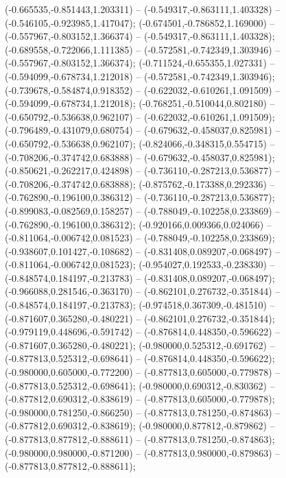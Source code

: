 (-0.665535,-0.851443,1.203311) -- (-0.549317,-0.863111,1.403328) -- (-0.546105,-0.923985,1.417047);
 (-0.674501,-0.786852,1.169000) -- (-0.557967,-0.803152,1.366374) -- (-0.549317,-0.863111,1.403328);
 (-0.689558,-0.722066,1.111385) -- (-0.572581,-0.742349,1.303946) -- (-0.557967,-0.803152,1.366374);
 (-0.711524,-0.655355,1.027331) -- (-0.594099,-0.678734,1.212018) -- (-0.572581,-0.742349,1.303946);
 (-0.739678,-0.584874,0.918352) -- (-0.622032,-0.610261,1.091509) -- (-0.594099,-0.678734,1.212018);
 (-0.768251,-0.510044,0.802180) -- (-0.650792,-0.536638,0.962107) -- (-0.622032,-0.610261,1.091509);
 (-0.796489,-0.431079,0.680754) -- (-0.679632,-0.458037,0.825981) -- (-0.650792,-0.536638,0.962107);
 (-0.824066,-0.348315,0.554715) -- (-0.708206,-0.374742,0.683888) -- (-0.679632,-0.458037,0.825981);
 (-0.850621,-0.262217,0.424898) -- (-0.736110,-0.287213,0.536877) -- (-0.708206,-0.374742,0.683888);
 (-0.875762,-0.173388,0.292336) -- (-0.762890,-0.196100,0.386312) -- (-0.736110,-0.287213,0.536877);
 (-0.899083,-0.082569,0.158257) -- (-0.788049,-0.102258,0.233869) -- (-0.762890,-0.196100,0.386312);
 (-0.920166,0.009366,0.024066) -- (-0.811064,-0.006742,0.081523) -- (-0.788049,-0.102258,0.233869);
 (-0.938607,0.101427,-0.108682) -- (-0.831408,0.089207,-0.068497) -- (-0.811064,-0.006742,0.081523);
 (-0.954027,0.192533,-0.238330) -- (-0.848574,0.184197,-0.213783) -- (-0.831408,0.089207,-0.068497);
 (-0.966088,0.281546,-0.363170) -- (-0.862101,0.276732,-0.351844) -- (-0.848574,0.184197,-0.213783);
 (-0.974518,0.367309,-0.481510) -- (-0.871607,0.365280,-0.480221) -- (-0.862101,0.276732,-0.351844);
 (-0.979119,0.448696,-0.591742) -- (-0.876814,0.448350,-0.596622) -- (-0.871607,0.365280,-0.480221);
 (-0.980000,0.525312,-0.691762) -- (-0.877813,0.525312,-0.698641) -- (-0.876814,0.448350,-0.596622);
 (-0.980000,0.605000,-0.772200) -- (-0.877813,0.605000,-0.779878) -- (-0.877813,0.525312,-0.698641);
 (-0.980000,0.690312,-0.830362) -- (-0.877812,0.690312,-0.838619) -- (-0.877813,0.605000,-0.779878);
 (-0.980000,0.781250,-0.866250) -- (-0.877813,0.781250,-0.874863) -- (-0.877812,0.690312,-0.838619);
 (-0.980000,0.877812,-0.879862) -- (-0.877813,0.877812,-0.888611) -- (-0.877813,0.781250,-0.874863);
 (-0.980000,0.980000,-0.871200) -- (-0.877813,0.980000,-0.879863) -- (-0.877813,0.877812,-0.888611);
